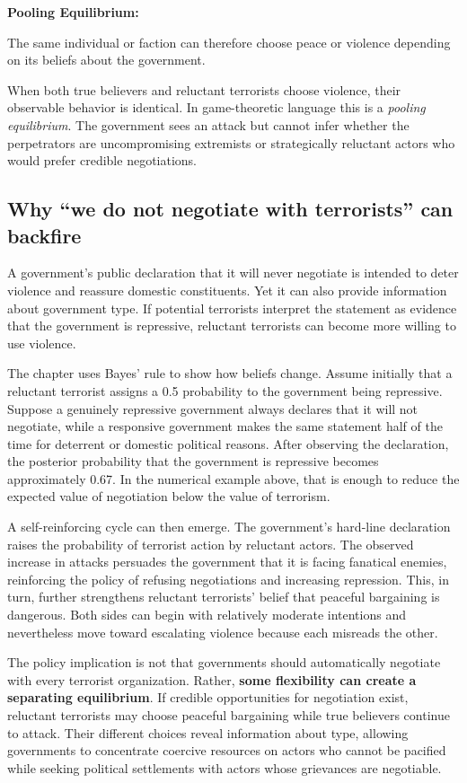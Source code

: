 \textbf{Pooling Equilibrium:}

The same individual or faction can therefore choose peace or violence depending on its beliefs about the government.

When both true believers and reluctant terrorists choose violence, their observable behavior is identical. In game-theoretic language this is a \textit{pooling equilibrium}. The government sees an attack but cannot infer whether the perpetrators are uncompromising extremists or strategically reluctant actors who would prefer credible negotiations.

\subsection{Why ``we do not negotiate with terrorists'' can backfire}

A government's public declaration that it will never negotiate is intended to deter violence and reassure domestic constituents. Yet it can also provide information about government type. If potential terrorists interpret the statement as evidence that the government is repressive, reluctant terrorists can become more willing to use violence.

The chapter uses Bayes' rule to show how beliefs change. Assume initially that a reluctant terrorist assigns a 0.5 probability to the government being repressive. Suppose a genuinely repressive government always declares that it will not negotiate, while a responsive government makes the same statement half of the time for deterrent or domestic political reasons. After observing the declaration, the posterior probability that the government is repressive becomes approximately 0.67. In the numerical example above, that is enough to reduce the expected value of negotiation below the value of terrorism.

A self-reinforcing cycle can then emerge. The government's hard-line declaration raises the probability of terrorist action by reluctant actors. The observed increase in attacks persuades the government that it is facing fanatical enemies, reinforcing the policy of refusing negotiations and increasing repression. This, in turn, further strengthens reluctant terrorists' belief that peaceful bargaining is dangerous. Both sides can begin with relatively moderate intentions and nevertheless move toward escalating violence because each misreads the other.

The policy implication is not that governments should automatically negotiate with every terrorist organization. Rather, \textbf{some flexibility can create a separating equilibrium}. If credible opportunities for negotiation exist, reluctant terrorists may choose peaceful bargaining while true believers continue to attack. Their different choices reveal information about type, allowing governments to concentrate coercive resources on actors who cannot be pacified while seeking political settlements with actors whose grievances are negotiable.

